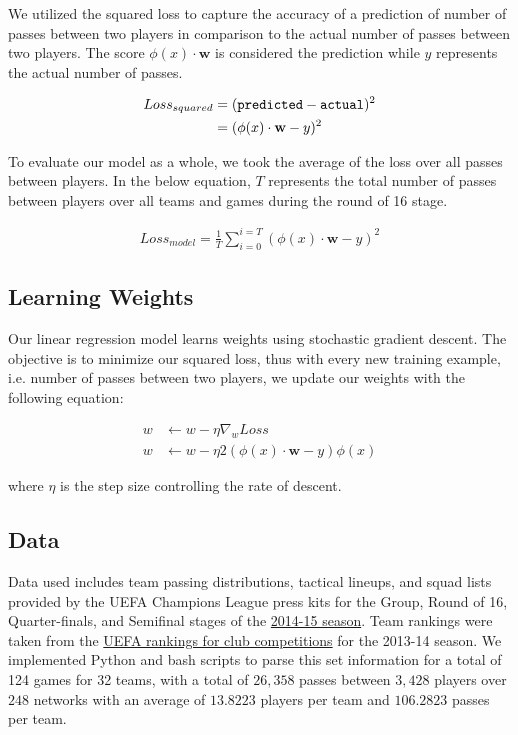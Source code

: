 \documentclass[11pt,letterpaper]{article}
\begin{document}
We utilized the squared loss to capture the accuracy of a prediction of number of passes between two players in comparison to the actual number of passes between two players. The score $\phi(x) \cdot \mathbf{w}$ is considered the prediction while $y$ represents the actual number of passes.

\begin{align*}
Loss_{squared} &= ({\tt predicted} - {\tt actual})^2 \\
&= (\phi(x) \cdot \mathbf{w} - y)^2
\end{align*}

To evaluate our model as a whole, we took the average of the loss over all passes between players. In the below equation, $T$ represents the total number of passes between players over all teams and games during the round of 16 stage.

\begin{align}
Loss_{model} = \frac{1}{T} \sum_{i = 0}^{i = T} (\phi(x) \cdot \mathbf{w} - y)^2
\end{align}

\subsection{Learning Weights}
Our linear regression model learns weights using stochastic gradient descent. The objective is to minimize our squared loss, thus with every new training example, i.e. number of passes between two players, we update our weights with the following equation:

\begin{align*}
w &\leftarrow w - \eta \nabla_w Loss \\
w &\leftarrow w - \eta 2(\phi(x) \cdot \mathbf{w} - y)\phi(x)
\end{align*}

where $\eta$ is the step size controlling the rate of descent.

\subsection{Data}
Data used includes team passing distributions, tactical lineups, and squad lists provided by the UEFA Champions League press kits for the Group, Round of 16, Quarter-finals, and Semifinal stages of the \href{http://www.uefa.org/mediaservices/presskits/uefachampionsleague/season=2015/index.html}{2014-15 season}. Team rankings were taken from the \href{http://www.uefa.com/memberassociations/uefarankings/club/season=2015/index.html}{UEFA rankings for club competitions} for the 2013-14 season. We implemented Python and bash scripts to parse this set information for a total of 124 games for 32 teams, with a total of $26,358$ passes between $3,428$ players over $248$ networks with an average of $13.8223$ players per team and $106.2823$ passes per team.
\end{document}
